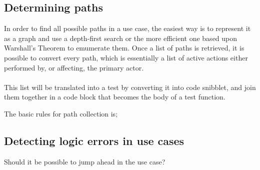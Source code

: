 \subsection{Determining paths}
In order to find all possible paths in a use case, the easiest way is to represent it as a graph and use a depth-first search or the more efficient one based upon Warshall's Theorem\cite{rubin1978enumerating} to emumerate them. Once a list of paths is retrieved, it is possible to convert every path, which is essentially a list of active actions either performed by, or affecting, the primary actor.\\\\
This list will be translated into a test by converting it into code snibblet, and join them together in a code block that becomes the body of a test function.

The basic rules for path collection is;

\subsection{Detecting logic errors in use cases}
Should it be possible to jump ahead in the use case?









